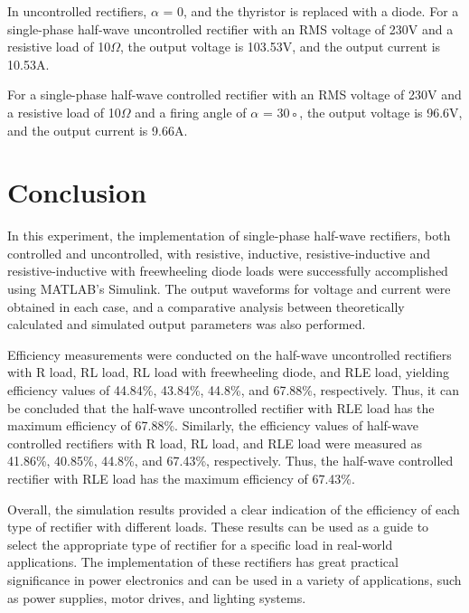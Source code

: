 In uncontrolled rectifiers, $ \alpha$ = 0, and the thyristor is replaced with a diode.
For a single-phase half-wave uncontrolled rectifier with an RMS voltage of 230V
and a resistive load of 10$ \Omega $,
the output voltage is 103.53V, and the output current is 10.53A.

For a single-phase half-wave controlled rectifier with an RMS voltage of 230V
and a resistive load of 10$ \Omega $ and a firing angle of $ \alpha  $ = 30◦, the output voltage
is 96.6V, and the output current is 9.66A.

\pagebreak











\section{Conclusion}


\hspace{\parindent}

In this experiment, the implementation of single-phase half-wave rectifiers, both controlled and uncontrolled, with resistive, inductive, resistive-inductive and resistive-inductive with freewheeling diode loads were successfully accomplished using MATLAB's Simulink. The output waveforms for voltage and current were obtained in each case, and a comparative analysis between theoretically calculated and simulated output parameters was also performed.

Efficiency measurements were conducted on the half-wave uncontrolled rectifiers with R load, RL load, RL load with freewheeling diode, and RLE load, yielding efficiency values of 44.84\%, 43.84\%, 44.8\%, and 67.88\%, respectively. Thus, it can be concluded that the half-wave uncontrolled rectifier with RLE load has the maximum efficiency of 67.88\%. Similarly, the efficiency values of half-wave controlled rectifiers with R load, RL load, and RLE load were measured as 41.86\%, 40.85\%, 44.8\%, and 67.43\%, respectively. Thus, the half-wave controlled rectifier with RLE load has the maximum efficiency of 67.43\%.

Overall, the simulation results provided a clear indication of the efficiency of each type of rectifier with different loads. These results can be used as a guide to select the appropriate type of rectifier for a specific load in real-world applications. The implementation of these rectifiers has great practical significance in power electronics and can be used in a variety of applications, such as power supplies, motor drives, and lighting systems.
\pagebreak
